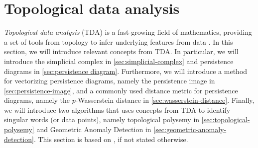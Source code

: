 \section{Topological data analysis}
\label{sec:topological-data-analysis}
\textit{Topological data analysis} (TDA) is a fast-growing field of mathematics, providing a set of tools from topology to infer underlying features from data \cite{chazal2021introduction}. In this section, we will introduce relevant concepts from TDA. In particular, we will introduce the simplicial complex in \cref{sec:simplicial-complex} and persistence diagrams in \cref{sec:persistence diagram}. Furthermore, we will introduce a method for vectorizing persistence diagrams, namely the persistence image in \cref{sec:persistence-image}, and a commonly used distance metric for persistence diagrams, namely the $p$-Wasserstein distance in \cref{sec:wasserstein-distance}. Finally, we will introduce two algorithms that uses concepts from TDA to identify singular words (or data points), namely topological polysemy in \cref{sec:topological-polysemy} and Geometric Anomaly Detection in \cref{sec:geometric-anomaly-detection}. This section is based on \cite{Edelsbrunner2010,chazal2021introduction}, if not stated otherwise.

